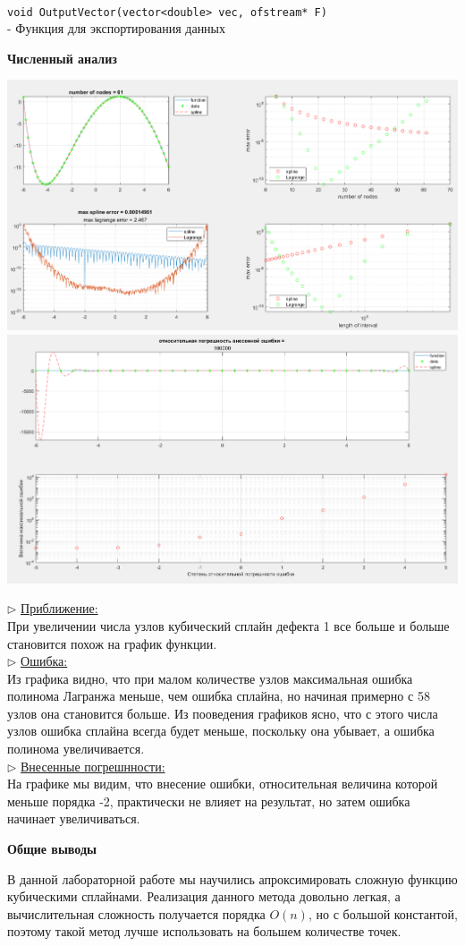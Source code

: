 \documentclass{article}
\begin{document}
	\\
	\verb|void OutputVector(vector<double> vec, ofstream* F)|\\
	- Функция для экспортирования данных
	\begin{center} \textbf{Численный анализ}\end{center}
	\begin{center}
		\includegraphics[scale = 0.4]{Приближение}
		\includegraphics[scale = 0.385]{Ошибка в доп условиях}
	\end{center}
	$\triangleright$ \underline{Приближение:}\\
	При увеличении числа узлов кубический сплайн дефекта 1 все больше и больше становится похож на график функции.\\
	$\triangleright$ \underline{Ошибка:}\\
	Из графика видно, что при малом количестве узлов максимальная ошибка полинома Лагранжа меньше, чем ошибка сплайна, но начиная примерно с 58 узлов она становится больше. Из пооведения графиков ясно, что с этого числа узлов ошибка сплайна всегда будет меньше, поскольку она убывает, а ошибка полинома увеличивается.\\
	$\triangleright$ \underline{Внесенные погрешнности:}\\
	На графике мы видим, что внесение ошибки, относительная величина которой меньше порядка -2, практически не влияет на результат, но затем ошибка начинает увеличиваться.
	\begin{center} \textbf{Общие выводы}\end{center}
	В данной лабораторной работе мы научились апроксимировать сложную функцию кубическими сплайнами. Реализация данного метода довольно легкая, а вычислительная сложность получается порядка $O(n)$, но с большой константой, поэтому такой метод лучше использовать на большем количестве точек.   
\end{document}
